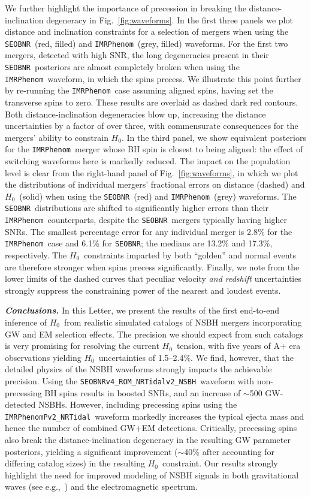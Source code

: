 \documentclass[%
 reprint,
 superscriptaddress,
 nofootinbib,
 amsmath,amssymb,
 aps,
]{revtex4-2}
\newcommand{\hubble}{\ensuremath{H_0}}
\newcommand{\seobnr}{\texttt{SEOBNR}}
\newcommand{\seobnrfull}{\texttt{SEOBNRv4\_ROM\_NRTidalv2\_NSBH}}
\newcommand{\imrp}{\texttt{IMRPhenom}}
\newcommand{\imrpfull}{\texttt{IMRPhenomPv2\_NRTidal}}
\begin{document}
We further highlight the importance of precession in breaking the distance-inclination degeneracy in Fig.~\ref{fig:waveforms}. In the first three panels we plot distance and inclination constraints for a selection of mergers when using the \seobnr\ (red, filled) and \imrp\ (grey, filled) waveforms. For the first two mergers, detected with high SNR, the long degeneracies present in their \seobnr\ posteriors are almost completely broken when using the \imrp\ waveform, in which the spins precess. We illustrate this point further by re-running the \imrp\ case assuming aligned spins, having set the transverse spins to zero. These results are overlaid as dashed dark red contours. Both distance-inclination degeneracies blow up, increasing the distance uncertainties by a factor of over three, with commensurate consequences for the mergers' ability to constrain $H_0$. In the third panel, we show equivalent posteriors for the \imrp\ merger whose BH spin is closest to being aligned: the effect of switching waveforms here is markedly reduced. The impact on the population level is clear from the right-hand panel of Fig.~\ref{fig:waveforms}, in which we plot the distributions of individual mergers' fractional errors on distance (dashed) and \hubble\ (solid) when using the \seobnr\ (red) and \imrp\ (grey) waveforms. The \seobnr\ distributions are shifted to significantly higher errors than their \imrp\ counterparts, despite the \seobnr\ mergers typically having higher SNRs. The smallest percentage error for any individual merger is 2.8\% for the \imrp\ case and 6.1\% for \seobnr; the medians are 13.2\% and 17.3\%, respectively. The \hubble\ constraints imparted by both ``golden'' and normal events are therefore stronger when spins precess significantly. Finally, we note from the lower limits of the dashed curves that peculiar velocity {\it and redshift} uncertainties strongly suppress the constraining power of the nearest and loudest events.


\textbf{\emph{Conclusions.}} In this Letter, we present the results of the first end-to-end inference of \hubble\ from realistic simulated catalogs of NSBH mergers incorporating GW and EM selection effects. The precision we should expect from such catalogs is very promising for resolving the current \hubble\ tension, with five years of A+ era observations yielding \hubble\ uncertainties of 1.5--2.4\%. We find, however, that the detailed physics of the NSBH waveforms strongly impacts the achievable precision. Using the \seobnrfull\ waveform with non-precessing BH spins results in boosted SNRs, and an increase of $\sim$500 GW-detected NSBHs. However, including precessing spins using the \imrpfull\ waveform markedly increases the typical ejecta mass and hence the number of combined GW+EM detections. Critically, precessing spins also break the distance-inclination degeneracy in the resulting GW parameter posteriors, yielding a significant improvement ($\sim$40\% after accounting for differing catalog sizes) in the resulting \hubble\ constraint. Our results strongly highlight the need for improved modeling of NSBH signals in both gravitational waves (see e.g.,~\cite{YHuang_etal:2020}) and the electromagnetic spectrum.
\end{document}
